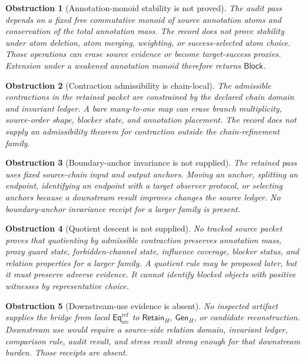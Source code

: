 \documentclass[11pt]{article}
\newcommand{\EqRef}{\mathsf{Eq}_{\mathrm{src}}^{\mathrm{ref}}}
\newcommand{\RetainH}{\mathsf{Retain}_{H}}
\newcommand{\GenH}{\mathsf{Gen}_{H}}
\newcommand{\Block}{\mathsf{Block}}
\newtheorem{obstruction}{Obstruction}
\begin{document}
\begin{obstruction}[Annotation-monoid stability is not proved]
The audit pass depends on a fixed free commutative monoid of source
annotation atoms and conservation of the total annotation mass. The record
does not prove stability under atom deletion, atom merging, weighting, or
success-selected atom choice. Those operations can erase source evidence
or become target-success proxies. Extension under a weakened annotation
monoid therefore returns \(\Block\).
\end{obstruction}

\begin{obstruction}[Contraction admissibility is chain-local]
The admissible contractions in the retained packet are constrained by the
declared chain domain and invariant ledger. A bare many-to-one map can
erase branch multiplicity, source-order shape, blocker state, and
annotation placement. The record does not supply an admissibility theorem
for contraction outside the chain-refinement family.
\end{obstruction}

\begin{obstruction}[Boundary-anchor invariance is not supplied]
The retained pass uses fixed source-chain input and output anchors.
Moving an anchor, splitting an endpoint, identifying an endpoint with a
target observer protocol, or selecting anchors because a downstream result
improves changes the source ledger. No boundary-anchor invariance receipt
for a larger family is present.
\end{obstruction}

\begin{obstruction}[Quotient descent is not supplied]
No tracked source packet proves that quotienting by admissible
contraction preserves annotation mass, proxy guard state,
forbidden-channel state, influence coverage, blocker status, and relation
properties for a larger family. A quotient rule may be proposed later,
but it must preserve adverse evidence. It cannot identify blocked objects
with positive witnesses by representative choice.
\end{obstruction}

\begin{obstruction}[Downstream-use evidence is absent]
No inspected artifact supplies the bridge from local \(\EqRef\) to
\(\RetainH\), \(\GenH\), or candidate reconstruction. Downstream use would
require a source-side relation domain, invariant ledger, comparison rule,
audit result, and stress result strong enough for that downstream burden.
Those receipts are absent.
\end{obstruction}
\end{document}

